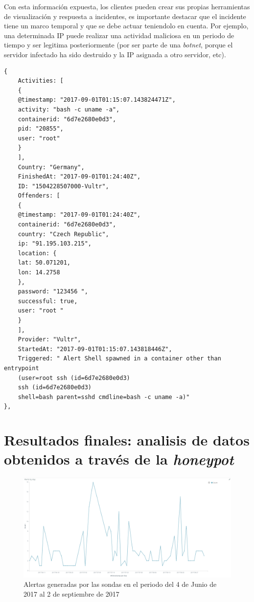 Con esta información expuesta, los clientes pueden crear sus propias herramientas de visualización y respuesta a incidentes, es importante destacar que 
el incidente tiene un marco temporal y que se debe actuar teniendolo en cuenta. Por ejemplo, una determinada IP puede realizar una actividad maliciosa en un 
periodo de tiempo y ser legitima posteriormente (por ser parte de una \emph{botnet}, porque el servidor infectado ha sido destruido y la IP asignada a otro servidor, etc).

\begin{verbatim}    
{
    Activities: [
    {
    @timestamp: "2017-09-01T01:15:07.143824471Z",
    activity: "bash -c uname -a",
    containerid: "6d7e2680e0d3",
    pid: "20855",
    user: "root"
    }
    ],
    Country: "Germany",
    FinishedAt: "2017-09-01T01:24:40Z",
    ID: "1504228507000-Vultr",
    Offenders: [
    {
    @timestamp: "2017-09-01T01:24:40Z",
    containerid: "6d7e2680e0d3",
    country: "Czech Republic",
    ip: "91.195.103.215",
    location: {
    lat: 50.071201,
    lon: 14.2758
    },
    password: "123456 ",
    successful: true,
    user: "root "
    }
    ],
    Provider: "Vultr",
    StartedAt: "2017-09-01T01:15:07.143818446Z",
    Triggered: " Alert Shell spawned in a container other than entrypoint 
    (user=root ssh (id=6d7e2680e0d3) 
    ssh (id=6d7e2680e0d3) 
    shell=bash parent=sshd cmdline=bash -c uname -a)"
},
\end{verbatim}
\bigskip


\section{Resultados finales: analisis de datos obtenidos a través de la \emph{honeypot}}

\begin{figure}[h]
    \centering
      \includegraphics[scale=0.3]{images/ElasticAlertsByDay}
    \caption{Alertas generadas por las sondas en el periodo del 4 de Junio de 2017 al 2 de septiembre de 2017}
    \label{fig:data-alerts-by-day}
  \end{figure}

